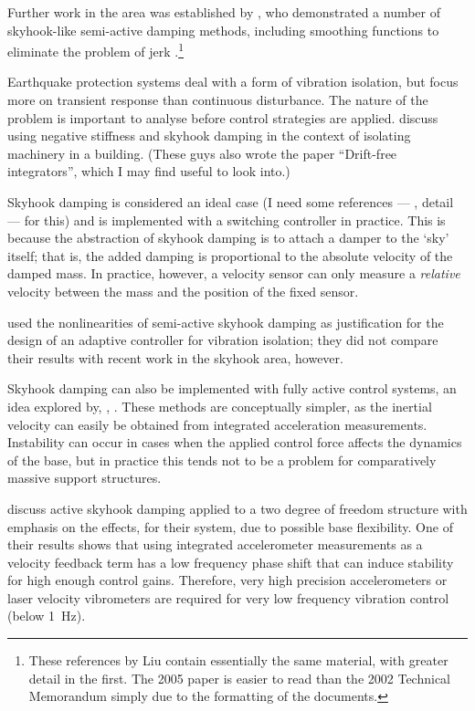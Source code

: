 Further work in the area was established by \textcite{liu2002}, who
demonstrated a number of skyhook-like semi-active damping methods, including
smoothing functions to eliminate the problem of jerk
\cite{liu2005}.\footnote{These references by Liu contain essentially the same
material, with greater detail in the first. The 2005 paper is easier to read
than the 2002 Technical Memorandum simply due to the formatting of the
documents.}

Earthquake protection systems deal with a form of vibration isolation,
but focus more on transient response than continuous disturbance. The
nature of the problem is important to analyse before control
strategies are applied. \textcite{gavin2007} discuss using negative
stiffness and skyhook damping in the context of isolating machinery
in a building. (These guys also wrote the paper ``Drift-free
integrators'', which I may find useful to look into.)

Skyhook damping is considered an ideal case (I need some references
— \ie, detail — for this) and is implemented with a switching
controller in practice. This is because the abstraction of skyhook
damping is to attach a damper to the `sky' itself; that is, the added
damping is proportional to the absolute velocity of the damped
mass. In practice, however, a velocity sensor can only measure a
\emph{relative} velocity between the mass and the position of the
fixed sensor.

\textcite{song2007} used the nonlinearities of semi-active skyhook damping as
justification for the design of an adaptive controller for vibration
isolation; they did not compare their results with recent work in the skyhook
area, however.

Skyhook damping can also be implemented with fully active control systems, an
idea explored by, \eg, \textcite{elliott2001,elliott2004,yan2006,kim2008a}
. These methods are conceptually simpler, as the
inertial velocity can easily be obtained from integrated acceleration
measurements. Instability can occur in cases when the applied control force
affects the dynamics of the base, but in practice this tends not to be a
problem for comparatively massive support structures.

\textcite{serrand2000} discuss active skyhook damping applied to a two degree
of freedom structure with emphasis on the effects, for their system, due to
possible base flexibility. One of their results shows that using integrated
accelerometer measurements as a velocity feedback term has a low frequency
phase shift that can induce stability for high enough control gains.
Therefore, very high precision accelerometers or laser velocity vibrometers
are required for very low frequency vibration control (below \SI{1}{Hz}).





